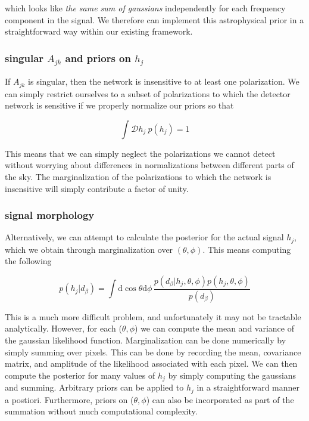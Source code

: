 \documentclass[10pt]{article}
\begin{document}
which looks like \emph{the same sum of gaussians} independently for each frequency component in the signal. We therefore can implement this astrophysical prior in a straightforward way within our existing framework.

\subsubsection{singular $A_{jk}$ and priors on $h_j$}

If $A_{jk}$ is singular, then the network is insensitive to at least one polarization. We can simply restrict ourselves to a subset of polarizations to which the detector network is sensitive if we properly normalize our priors so that

\begin{equation}
\int\mathcal{D}h_j\ p(h_j) = 1
\end{equation}

This means that we can simply neglect the polarizations we cannot detect without worrying about differences in normalizations between different parts of the sky. The marginalization of the polarizations to which the network is insensitive will simply contribute a factor of unity.


\subsubsection{signal morphology}

Alternatively, we can attempt to calculate the posterior for the actual signal $h_j$, which we obtain through marginalization over $(\theta, \phi)$. This means computing the following

\begin{equation}
p(h_j|d_\beta) = \int\mathrm{d}\cos\theta\mathrm{d}\phi\, \frac{p(d_\beta|h_j, \theta, \phi)p(h_j, \theta, \phi)}{p(d_\beta)}
\end{equation}

This is a much more difficult problem, and unfortunately it may not be tractable analytically. However, for each ($\theta,\phi$) we can compute the mean and variance of the gaussian likelihood function. Marginalization can be done numerically by simply summing over pixels. This can be done by recording the mean, covariance matrix, and amplitude of the likelihood associated with each pixel. We can then compute the posterior for many values of $h_j$ by simply computing the gaussians and summing. Arbitrary priors can be applied to $h_j$ in a straightforward manner a postiori. Furthermore, priors on ($\theta,\phi$) can also be incorporated as part of the summation without much computational complexity.
\end{document}
